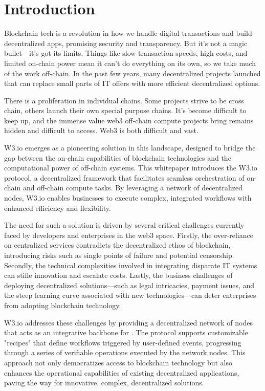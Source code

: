 \documentclass[11pt]{article}
\begin{document}

\section{Introduction}
Blockchain tech is a revolution in how we handle digital transactions and build decentralized apps, promising security and transparency. But it's not a magic bullet—it's got its limits. Things like slow transaction speeds, high costs, and limited on-chain power mean it can't do everything on its own, so we take much of the work off-chain. In the past few years, many decentralized projects launched that can replace small parts of IT offers with more efficient decentralized options. 

There is a proliferation in individual chains. Some projects strive to be cross chain, others launch their own special purpose chains. It's become difficult to keep up, and the immense value web3 off-chain compute projects bring remains hidden and difficult to access. Web3 is both difficult and vast. 

W3.io emerges as a pioneering solution in this landscape, designed to bridge the gap between the on-chain capabilities of blockchain technologies and the computational power of off-chain systems. This whitepaper introduces the W3.io protocol, a decentralized framework that facilitates seamless orchestration of on-chain and off-chain compute tasks. By leveraging a network of decentralized nodes, W3.io enables businesses to execute complex, integrated workflows with enhanced efficiency and flexibility.

The need for such a solution is driven by several critical challenges currently faced by developers and enterprises in the web3 space. Firstly, the over-reliance on centralized services contradicts the decentralized ethos of blockchain, introducing risks such as single points of failure and potential censorship. Secondly, the technical complexities involved in integrating disparate IT systems can stifle innovation and escalate costs. Lastly, the business challenges of deploying decentralized solutions—such as legal intricacies, payment issues, and the steep learning curve associated with new technologies—can deter enterprises from adopting blockchain technology.

W3.io addresses these challenges by providing a decentralized network of nodes that acts as an integrative backbone for . The protocol supports customizable "recipes" that define workflows triggered by user-defined events, progressing through a series of verifiable operations executed by the network nodes. This approach not only democratizes access to blockchain technology but also enhances the operational capabilities of existing decentralized applications, paving the way for innovative, complex, decentralized solutions.
\end{document}
